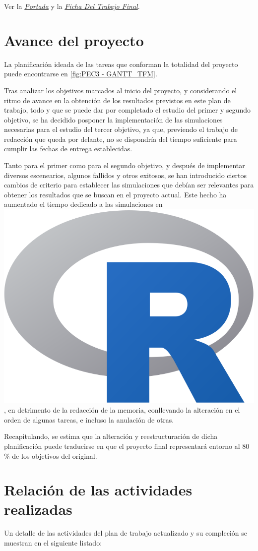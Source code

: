 \documentclass[IB,BIB]{TFUOC}%
\newcommand{\checkbox}{\text{\fboxsep=-.15pt\fbox{\rule{0pt}{1.5ex}\rule{1.5ex}{0pt}}}} %
\newcommand{\cmark}{\ding{51}} %
\newcommand{\xmark}{\ding{55}} %
\newcommand{\done}{\rlap{\checkbox}{\raisebox{1.2pt}{\large\hspace{1pt}\cmark}}
\hspace{-2.5pt}}
\newcommand{\wontfix}{\rlap{\checkbox}{\raisebox{-1.5pt}{\large\hspace{-.75pt}\xmark}}
\hspace{-2.5pt}}
\newcommand{\Rlogo}{\protect\includegraphics[height=2.5ex,keepaspectratio]{Rlogo.png}}
\begin{document}
Ver la \textit{\hyperlink{portada}{Portada}} y la \textit{\hyperlink{ficha}{Ficha Del Trabajo Final}}. %


\section{Avance del proyecto}
\label{sec:Avance del proyecto}

La planificación ideada de las tareas que conforman la totalidad del proyecto puede encontrarse en \ref{fig:PEC3 - GANTT_TFM}.

Tras analizar los objetivos marcados al inicio del proyecto, y considerando el ritmo de avance en la obtención de los resultados previstos en este plan de trabajo, todo y que se puede dar por completado el estudio del primer y segundo objetivo, se ha decidido posponer la implementación de las simulaciones necesarias para el estudio del tercer objetivo, ya que, previendo el trabajo de redacción que queda por delante, no se dispondría del tiempo suficiente para cumplir las fechas de entrega establecidas. 

Tanto para el primer como para el segundo objetivo, y después de implementar diversos escenearios, algunos fallidos y otros exitosos, se han introducido ciertos cambios de criterio para establecer las simulaciones que debían ser relevantes para obtener los resultados que se buscan en el proyecto actual. Este hecho ha aumentado el tiempo dedicado a las simulaciones en \hspace{-.2em}\Rlogo\hspace{+.1em}, en detrimento de la redacción de la memoria, conllevando la alteración en el orden de algunas tareas, e incluso la anulación de otras.

Recapitulando, se estima que la alteración y reestructuración de dicha planificación puede traducirse en que el proyecto final representará entorno al 80 \% de los objetivos del original.


\section{Relación de las actividades realizadas}
\label{sec:Relación de las actividades realizadas}

Un detalle de las actividades del plan de trabajo actualizado y su compleción se muestran en el siguiente listado:

\newpage

\end{document}
